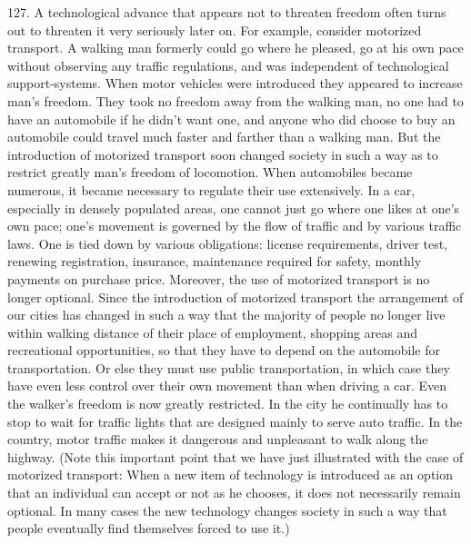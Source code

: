 \documentclass{article}
\begin{document}
127.  A technological advance that appears not to threaten freedom often turns out to threaten it 
very  seriously  later  on.   For  example,  consider  motorized  transport.   A  walking  man  formerly  
could go where he pleased, go at his own pace without observing any traffic regulations, and was 
independent  of  technological  support-systems.   When  motor  vehicles  were  introduced  they  
appeared to increase man’s freedom.  They took no freedom away from the walking man, no one 
had to have an automobile if he didn’t want one, and anyone who did choose to buy an automobile 
could  travel  much  faster  and  farther  than  a  walking  man.   But  the  introduction  of  motorized  
transport soon changed society in such a way as to restrict greatly man’s freedom of 
locomotion.   When  automobiles  became  numerous,  it  became  necessary  to  regulate  their  use  
extensively.  In a car, especially in densely populated areas, one cannot just go where one likes at 
one’s  own  pace;  one’s  movement  is  governed  by  the  flow  of  traffic  and  by  various  traffic  
laws.   One  is  tied  down  by  various  obligations:  license  requirements,  driver  test,  renewing 
registration, insurance, maintenance required for safety, monthly payments on purchase 
price.  Moreover, the use of motorized transport is no longer optional.  Since the introduction of 
motorized transport the arrangement of our cities has changed in such a way that the majority of 
people no longer live within walking distance of their place of employment, shopping areas and 
recreational opportunities, so that they have to depend on the automobile for transportation.  Or 
else they must use public transportation, in which case they have even less control over their own 
movement than when driving a car.  Even the walker’s freedom is now greatly restricted.  In the 
city  he  continually  has  to  stop  to  wait  for  traffic  lights  that  are  designed  mainly  to  serve  auto 
traffic.   In  the  country,  motor  traffic  makes  it  dangerous  and  unpleasant  to  walk  along  the  
highway.   (Note  this  important  point  that  we  have  just  illustrated  with  the  case  of  motorized  
transport: When a new item of technology is introduced as an option that an individual can accept 
or not as he chooses, it does not necessarily remain optional.  In many cases the new technology 
changes society in such a way that people eventually find themselves forced to use it.) \vspace{\baselineskip}
\end{document}

